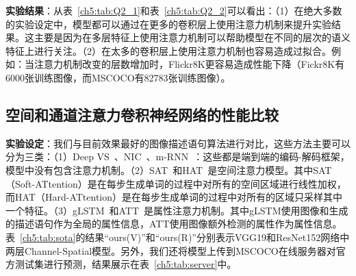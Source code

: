 \textbf{实验结果}：从表~\ref{ch5:tab:Q2_1}和表~\ref{ch5:tab:Q2_2}可以看出：（1）在绝大多数的实验设定中，模型都可以通过在更多的卷积层上使用注意力机制来提升实验结果。这主要是因为在多层特征上使用注意力机制可以帮助模型在不同的层次的语义特征上进行关注。（2）在太多的卷积层上使用注意力机制也容易造成过拟合。例如：当注意力机制改变的层数增加时，Flickr8K更容易造成性能下降（Fickr8K有6000张训练图像，而MSCOCO有82783张训练图像）。



\subsection{空间和通道注意力卷积神经网络的性能比较}

\textbf{实验设定}：我们与目前效果最好的图像描述语句算法进行对比，这些方法主要可以分为三类：（1）Deep VS~\cite{karpathy2015deep}、NIC~\cite{vinyals2015show}、m-RNN~\cite{mao2015deep}：这些都是端到端的编码-解码框架，模型中没有包含注意力机制。（2）SAT~\cite{xu2015show}和HAT~\cite{xu2015show}是空间注意力模型。其中SAT（Soft-ATtention）是在每步生成单词的过程中对所有的空间区域进行线性加权，而HAT（Hard-ATtention）是在每步生成单词的过程中对所有的区域只采样其中一个特征。（3）gLSTM~\cite{jia2015guiding}和ATT~\cite{you2016image}是属性注意力机制。其中gLSTM使用图像和生成的描述语句作为全局的属性信息，ATT使用图像额外检测的属性作为属性信息。表~\ref{ch5:tab:sota}的结果“ours(V)”和“ours(R)”分别表示VGG19和ResNet152网络中两层Channel-Spatial模型。另外，我们还将模型上传到MSCOCO在线服务器对官方测试集进行预测，结果展示在表~\ref{ch5:tab:server}中。

